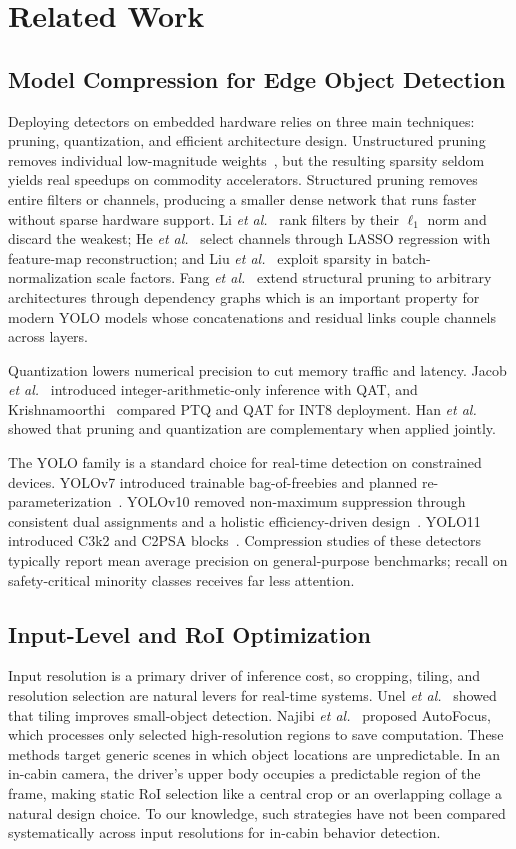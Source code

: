 \documentclass[conference]{IEEEtran}
\begin{document}
\section{Related Work}

\subsection{Model Compression for Edge Object Detection}
Deploying detectors on embedded hardware relies on three main techniques: pruning, quantization, and efficient architecture design. Unstructured pruning removes individual low-magnitude weights~\cite{b8}, but the resulting sparsity seldom yields real speedups on commodity accelerators. Structured pruning removes entire filters or channels, producing a smaller dense network that runs faster without sparse hardware support. Li \emph{et al.}\ \cite{b9} rank filters by their $\ell_1$ norm and discard the weakest; He \emph{et al.}\ \cite{b10} select channels through LASSO regression with feature-map reconstruction; and Liu \emph{et al.}\ \cite{b11} exploit sparsity in batch-normalization scale factors. Fang \emph{et al.}\ \cite{b12} extend structural pruning to arbitrary architectures through dependency graphs which is an important property for modern YOLO models whose concatenations and residual links couple channels across layers.

Quantization lowers numerical precision to cut memory traffic and latency. Jacob \emph{et al.}\ \cite{b13} introduced integer-arithmetic-only inference with QAT, and Krishnamoorthi~\cite{b14} compared PTQ and QAT for INT8 deployment. Han \emph{et al.}\ \cite{b8} showed that pruning and quantization are complementary when applied jointly.

The YOLO family is a standard choice for real-time detection on constrained devices. YOLOv7 introduced trainable bag-of-freebies and planned re-parameterization~\cite{b15}. YOLOv10 removed non-maximum suppression through consistent dual assignments and a holistic efficiency-driven design~\cite{b16}. YOLO11 introduced C3k2 and C2PSA blocks~\cite{b17}. Compression studies of these detectors typically report mean average precision on general-purpose benchmarks; recall on safety-critical minority classes receives far less attention.

\subsection{Input-Level and RoI Optimization}
Input resolution is a primary driver of inference cost, so cropping, tiling, and resolution selection are natural levers for real-time systems. Unel \emph{et al.}\ \cite{b18} showed that tiling improves small-object detection. Najibi \emph{et al.}\ \cite{b19} proposed AutoFocus, which processes only selected high-resolution regions to save computation. These methods target generic scenes in which object locations are unpredictable. In an in-cabin camera, the driver's upper body occupies a predictable region of the frame, making static RoI selection like a central crop or an overlapping collage a natural design choice. To our knowledge, such strategies have not been compared systematically across input resolutions for in-cabin behavior detection.
\end{document}
